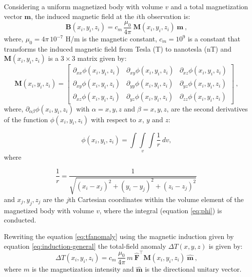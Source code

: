 Considering a uniform magnetized body with volume $v$ and a total magnetization vector $\mathbf{m}$, the induced magnetic field at the $i$th observation is:
\begin{equation}
	\mathbf{B}(x_i, y_i, z_i) = c_{m} \, \frac{\mu_{0}}{4\pi} \: \mathbf{M}(x_i, y_i, z_i) \: 
	\mathbf{m} \: ,
	\label{eq:induction-general}
\end{equation}
where, $\mu_{0} = 4\pi \, 10^{-7}$ H/m is the magnetic constant, 
$c_{m} = 10^{9}$ is a constant that transforms the induced magnetic field from Tesla (T) to nanotesla (nT) and 
$\mathbf{M}(x_i, y_i, z_i)$ is a $3 \times 3$ matrix given by:
\begin{equation}
	\mathbf{M}(x_i, y_i, z_i) =
	\left[
	\begin{array}{ccc}
		\partial_{xx} \phi(x_i,y_i,z_i) & \partial_{xy} \phi(x_i,y_i,z_i) & 
		\partial_{xz} \phi(x_i,y_i,z_i) \\
		\partial_{xy} \phi(x_i,y_i,z_i) & \partial_{yy} \phi(x_i,y_i,z_i) & 
		\partial_{yz} \phi(x_i,y_i,z_i) \\
		\partial_{xz} \phi(x_i,y_i,z_i) & \partial_{yz} \phi(x_i,y_i,z_i) & 
		\partial_{zz} \phi(x_i,y_i,z_i)
	\end{array}
	\right] \: ,
	\label{eq:M}
\end{equation}
where, $\partial_{\alpha\beta} \phi(x_i,y_i,z_i)$ with $\alpha = x, y, z$ and 
$\beta = x, y, z$, are the second derivatives of the function $\phi(x_i,y_i,z_i)$
with respect to $x$, $y$ and $z$:

\begin{equation}
	\phi(x_i,y_i,z_i) = \int\int\limits_{v}\int \frac{1}{r} \: dv,
	\label{eq:phi}
\end{equation}
where 

\begin{equation}
	\dfrac{1}{r} = \dfrac{1}{\sqrt{(x_i - x_j)^{2} + 
			(y_i - y_j)^{2} + (z_i - z_j)^{2}}} \,
	\label{eq:r}
\end{equation}
and $x_j, y_j, z_j$ are the $j$th Cartesian coordinates within the volume element of the magnetized body with volume $v$, where the integral (equation \ref{eq:phi}) is conducted.

Rewriting the equation \ref{eq:tfanomaly} using the magnetic induction given by equation \ref{eq:induction-general} the total-field anomaly $\Delta T(x, y, z)$ is given by:
\begin{equation}
\Delta T(x_i, y_i, z_i) = c_{m} \, \frac{\mu_{0}}{4\pi} \, m \: \hat{\mathbf{F}}^{\top} 
\mathbf{M}(x_i, y_i, z_i) \: \hat{\mathbf{m}} \: ,
\label{eq:tfanomaly-general}
\end{equation}
where $m$ is the magnetization intensity and $\hat{\mathbf{m}}$ is the directional unitary vector.

